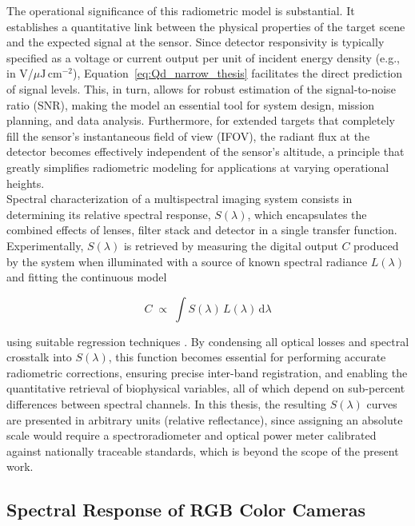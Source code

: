 \noindent The operational significance of this radiometric model is substantial. It establishes a quantitative link between the physical properties of the target scene and the expected signal at the sensor. Since detector responsivity is typically specified as a voltage or current output per unit of incident energy density (e.g., in V/\(\mu\mathrm{J}\,\mathrm{cm}^{-2}\)), Equation~\eqref{eq:Qd_narrow_thesis} facilitates the direct prediction of signal levels. This, in turn, allows for robust estimation of the signal-to-noise ratio (SNR), making the model an essential tool for system design, mission planning, and data analysis. Furthermore, for extended targets that completely fill the sensor's instantaneous field of view (IFOV), the radiant flux at the detector becomes effectively independent of the sensor's altitude, a principle that greatly simplifies radiometric modeling for applications at varying operational heights.\\

\noindent Spectral characterization of a multispectral imaging system consists in determining its relative spectral response, $S(\lambda)$, which encapsulates the combined effects of lenses, filter stack and detector in a single transfer function. Experimentally, $S(\lambda)$ is retrieved by measuring the digital output $C$ produced by the system when illuminated with a source of known spectral radiance $L(\lambda)$ and fitting the continuous model

\begin{equation}
    C \;\propto\;\int S(\lambda)\,L(\lambda)\,\mathrm{d}\lambda
\label{eq:spectral_transfer}
\end{equation}

\noindent using suitable regression techniques \cite{Uttner2006SpectralCameras}. By condensing all optical losses and spectral crosstalk into $S(\lambda)$, this function becomes essential for performing accurate radiometric corrections, ensuring precise inter-band registration, and enabling the quantitative retrieval of biophysical variables, all of which depend on sub-percent differences between spectral channels. In this thesis, the resulting $S(\lambda)$ curves are presented in arbitrary units (relative reflectance), since assigning an absolute scale would require a spectroradiometer and optical power meter calibrated against nationally traceable standards, which is beyond the scope of the present work.  


\subsection{Spectral Response of RGB Color Cameras}

